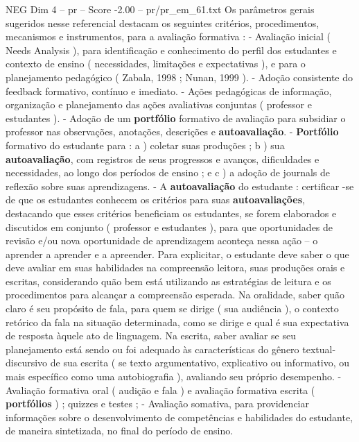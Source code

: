 \begin{textsample}{NEG Dim 4 – pr – Score -2.00 – pr/pr\_em\_61.txt}
Os parâmetros gerais sugeridos nesse referencial destacam os seguintes critérios, procedimentos, mecanismos e instrumentos, para a avaliação formativa : - Avaliação inicial ( Needs Analysis ), para identificação e conhecimento do perfil dos estudantes e contexto de ensino ( necessidades, limitações e expectativas ), e para o planejamento pedagógico ( Zabala, 1998 ; Nunan, 1999 ). - Adoção consistente do feedback formativo, contínuo e imediato. - Ações pedagógicas de informação, organização e planejamento das ações avaliativas conjuntas ( professor e estudantes ). - Adoção de um \textbf{portfólio} formativo de avaliação para subsidiar o professor nas observações, anotações, descrições e \textbf{autoavaliação}. - \textbf{Portfólio} formativo do estudante para : a ) coletar suas produções ; b ) sua \textbf{autoavaliação}, com registros de seus progressos e avanços, dificuldades e necessidades, ao longo dos períodos de ensino ; e c ) a adoção de journals de reflexão sobre suas aprendizagens. - A \textbf{autoavaliação} do estudante : certificar -se de que os estudantes conhecem os critérios para suas \textbf{autoavaliações}, destacando que esses critérios beneficiam os estudantes, se forem elaborados e discutidos em conjunto ( professor e estudantes ), para que oportunidades de revisão e/ou nova oportunidade de aprendizagem aconteça nessa ação – o aprender a aprender e a apreender.
Para explicitar, o estudante deve saber o que deve avaliar em suas habilidades na compreensão leitora, suas produções orais e escritas, considerando quão bem está utilizando as estratégias de leitura e os procedimentos para alcançar a compreensão esperada.
Na oralidade, saber quão claro é seu propósito de fala, para quem se dirige ( sua audiência ), o contexto retórico da fala na situação determinada, como se dirige e qual é sua expectativa de resposta àquele ato de linguagem.
Na escrita, saber avaliar se seu planejamento está sendo ou foi adequado às características do gênero textual-discursivo de sua escrita ( se texto argumentativo, explicativo ou informativo, ou mais específico como uma autobiografia ), avaliando seu próprio desempenho. - Avaliação formativa oral ( audição e fala ) e avaliação formativa escrita ( \textbf{portfólios} ) ; quizzes e testes ; - Avaliação somativa, para providenciar informações sobre o desenvolvimento de competências e habilidades do estudante, de maneira sintetizada, no final do período de ensino.

\end{textsample}
